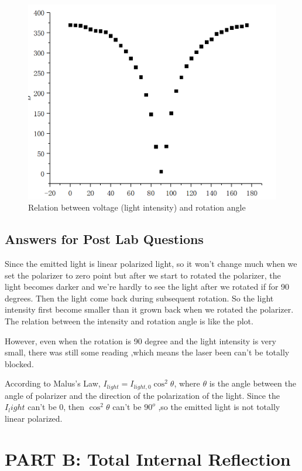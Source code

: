 \documentclass[12pt]{article}
\begin{document}
\begin{figure}[H]
\centering
\includegraphics[scale=0.5]{P1.jpg}
\caption{Relation between voltage (light intensity) and rotation angle}
\end{figure}
\subsection{Answers for Post Lab Questions}
Since the emitted light is linear polarized light, so it won't change much when we set the polarizer to zero point but after we start to rotated the polarizer, the light becomes darker and we're hardly to see the light after we rotated if for 90 degrees. Then the light come back during subsequent rotation. So the light intensity first become smaller than it grown back when we rotated the polarizer. The relation between the intensity and rotation angle is like the plot.
\par However, even when the rotation is 90 degree and the light intensity is very small, there was still some reading ,which means the laser been can't be totally blocked.
\par According to Malus's Law, $I_{light}=I_{light,0}\cos ^2\theta$, where $\theta$ is the angle between the angle of polarizer and the direction of the polarization of the light. Since the $I_light$ can't be 0, then $\cos^2\theta$ can't be $90^o$ ,so the emitted light is not totally linear polarized.
\section{PART B: Total Internal Reflection}
\end{document}
